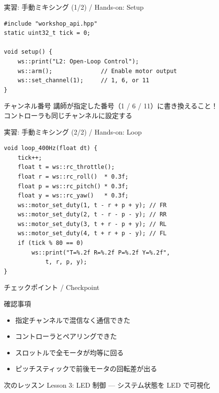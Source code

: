 \documentclass[aspectratio=169, 14pt]{beamer}
\begin{document}
\begin{frame}[fragile]{実習: 手動ミキシング (1/2) / Hands-on: Setup}
  \begin{lstlisting}[style=sfcpp, title={user\_code.cpp --- setup}]
#include "workshop_api.hpp"
static uint32_t tick = 0;

void setup() {
    ws::print("L2: Open-Loop Control");
    ws::arm();              // Enable motor output
    ws::set_channel(1);     // 1, 6, or 11
}
  \end{lstlisting}

  \vspace{0.5em}

  \begin{alertblock}{チャンネル番号}
    講師が指定した番号（1 / 6 / 11）に書き換えること！\\
    コントローラも同じチャンネルに設定する
  \end{alertblock}
\end{frame}

\begin{frame}[fragile]{実習: 手動ミキシング (2/2) / Hands-on: Loop}
  \begin{lstlisting}[style=sfcpp, title={user\_code.cpp --- loop}]
void loop_400Hz(float dt) {
    tick++;
    float t = ws::rc_throttle();
    float r = ws::rc_roll()  * 0.3f;
    float p = ws::rc_pitch() * 0.3f;
    float y = ws::rc_yaw()   * 0.3f;
    ws::motor_set_duty(1, t - r + p + y); // FR
    ws::motor_set_duty(2, t - r - p - y); // RR
    ws::motor_set_duty(3, t + r - p + y); // RL
    ws::motor_set_duty(4, t + r + p - y); // FL
    if (tick % 80 == 0)
        ws::print("T=%.2f R=%.2f P=%.2f Y=%.2f",
            t, r, p, y);
}
  \end{lstlisting}
\end{frame}

\begin{frame}{チェックポイント / Checkpoint}
  \begin{alertblock}{確認事項}
    \begin{itemize}
      \item[$\square$] 指定チャンネルで混信なく通信できた
      \item[$\square$] コントローラとペアリングできた
      \item[$\square$] スロットルで全モータが均等に回る
      \item[$\square$] ピッチスティックで前後モータの回転差が出る
    \end{itemize}
  \end{alertblock}

  \vspace{1em}

  \begin{block}{次のレッスン}
    Lesson 3: LED 制御 --- システム状態を LED で可視化
  \end{block}
\end{frame}
\end{document}
